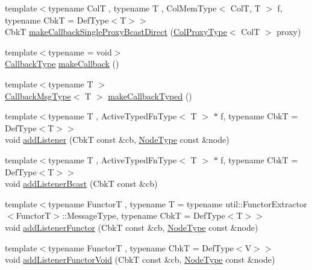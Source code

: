 \begin{DoxyCompactItemize}
\item 
{\footnotesize template$<$typename ColT , typename T , Col\+Mem\+Type$<$ Col\+T, T $>$ f, typename CbkT  = Def\+Type$<$\+T$>$$>$ }\\CbkT \hyperlink{structvt_1_1pipe_1_1_pipe_manager_t_l_aff70024da9ee15ef2c935ca21d18a80d}{make\+Callback\+Single\+Proxy\+Bcast\+Direct} (\hyperlink{structvt_1_1pipe_1_1_pipe_manager_t_l_af56c58cad882496e35f01227d4da3898}{Col\+Proxy\+Type}$<$ ColT $>$ proxy)
\item 
{\footnotesize template$<$typename  = void$>$ }\\\hyperlink{structvt_1_1pipe_1_1_pipe_manager_t_l_a1cc1d0f1c80a36488f9b5d282e9755d2}{Callback\+Type} \hyperlink{structvt_1_1pipe_1_1_pipe_manager_t_l_aff965bd75d398d45ad11d33feeb7a7c5}{make\+Callback} ()
\item 
{\footnotesize template$<$typename T $>$ }\\\hyperlink{structvt_1_1pipe_1_1_pipe_manager_t_l_af6fc2c17f1729fa06450441b0ee81cb1}{Callback\+Msg\+Type}$<$ T $>$ \hyperlink{structvt_1_1pipe_1_1_pipe_manager_t_l_a9644742f82b43a851e8a20755302a2e0}{make\+Callback\+Typed} ()
\item 
{\footnotesize template$<$typename T , Active\+Typed\+Fn\+Type$<$ T $>$ $\ast$ f, typename CbkT  = Def\+Type$<$\+T$>$$>$ }\\void \hyperlink{structvt_1_1pipe_1_1_pipe_manager_t_l_a379d983dfbf654ed01281d96148175f3}{add\+Listener} (CbkT const \&cb, \hyperlink{namespacevt_a866da9d0efc19c0a1ce79e9e492f47e2}{Node\+Type} const \&node)
\item 
{\footnotesize template$<$typename T , Active\+Typed\+Fn\+Type$<$ T $>$ $\ast$ f, typename CbkT  = Def\+Type$<$\+T$>$$>$ }\\void \hyperlink{structvt_1_1pipe_1_1_pipe_manager_t_l_a137d7271f189aa000427a3cb39bd7f52}{add\+Listener\+Bcast} (CbkT const \&cb)
\item 
{\footnotesize template$<$typename FunctorT , typename T  = typename util\+::\+Functor\+Extractor$<$\+Functor\+T$>$\+::\+Message\+Type, typename CbkT  = Def\+Type$<$\+T$>$$>$ }\\void \hyperlink{structvt_1_1pipe_1_1_pipe_manager_t_l_abc9236c8ff7a657b1b04fd7604d616b9}{add\+Listener\+Functor} (CbkT const \&cb, \hyperlink{namespacevt_a866da9d0efc19c0a1ce79e9e492f47e2}{Node\+Type} const \&node)
\item 
{\footnotesize template$<$typename FunctorT , typename CbkT  = Def\+Type$<$\+V$>$$>$ }\\void \hyperlink{structvt_1_1pipe_1_1_pipe_manager_t_l_a12cd5abf9d9a082369419a5cc5b7b0f8}{add\+Listener\+Functor\+Void} (CbkT const \&cb, \hyperlink{namespacevt_a866da9d0efc19c0a1ce79e9e492f47e2}{Node\+Type} const \&node)

\end{DoxyCompactItemize}

